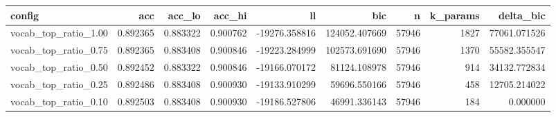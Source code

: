 \begin{tabular}{lrrrrrrrr}
\toprule
config & acc & acc\_lo & acc\_hi & ll & bic & n & k\_params & delta\_bic \\
\midrule
vocab\_top\_ratio\_1.00 & 0.892365 & 0.883322 & 0.900762 & -19276.358816 & 124052.407669 & 57946 & 1827 & 77061.071526 \\
vocab\_top\_ratio\_0.75 & 0.892365 & 0.883408 & 0.900846 & -19223.284999 & 102573.691690 & 57946 & 1370 & 55582.355547 \\
vocab\_top\_ratio\_0.50 & 0.892452 & 0.883322 & 0.900846 & -19166.070172 & 81124.108978 & 57946 & 914 & 34132.772834 \\
vocab\_top\_ratio\_0.25 & 0.892486 & 0.883408 & 0.900930 & -19133.910299 & 59696.550166 & 57946 & 458 & 12705.214022 \\
vocab\_top\_ratio\_0.10 & 0.892503 & 0.883408 & 0.900930 & -19186.527806 & 46991.336143 & 57946 & 184 & 0.000000 \\
\bottomrule
\end{tabular}
